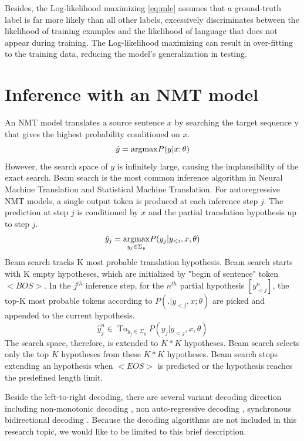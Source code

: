 Besides, the Log-likelihood maximizing \ref{eq:mle} assumes that a ground-truth label is far more likely than all other labels, excessively discriminates between the likelihood of training examples and the likelihood of language that does not appear during training. The Log-likelihood maximizing can result in over-fitting to the training data, reducing the model's generalization in testing.

\section{Inference with an NMT model} \label{sec:inference}
An NMT model translates a source sentence $x$ by searching the target sequence y that gives the highest probability conditioned on $x$.
\begin{equation}
\hat{y} = \displaystyle{\mathop{\operatorname*{argmax}}} P(y|x;\theta)
\end{equation}
However, the search space of $y$ is infinitely large, causing the implausibility of the exact search. Beam search \citep{Och98improving} is the most common inference algorithm in Neural Machine Translation and Statistical Machine Translation. For autoregressive NMT models, a single output token is produced at each inference step $j$. The prediction at step $j$ is conditioned by $x$ and the partial translation hypothesis up to step $j$.
\begin{equation}
\hat{y}_j = \displaystyle{\mathop{\operatorname*{argmax}}_{y_j \in \Sigma_y}} P(y_j|y_{<i},x,\theta)
\end{equation}
Beam search tracks K most probable translation hypothesis. Beam search starts with K empty hypotheses, which are initialized by "begin of sentence" token $<BOS>$. In the $j^{th}$ inference step,
for the $n^{th}$ partial hypothesis $[y^{n}_{<j}]$, the top-K most probable tokens according to $P(.| y_{<j},x;\theta)$ are picked and appended to the current hypothesis.
\begin{equation}
\hat{y}^n_j \in \displaystyle{\mathop{Top_{K}}_{y_j \in \Sigma_y}} P(y_j|y_{<j},x,\theta)
\end{equation}
The search space, therefore, is extended to $K*K$ hypotheses. Beam search selects only the top $K$ hypotheses from these $K*K$ hypotheses. Beam search stops extending an hypothesis when $<EOS>$ is predicted or  the hypothesis reaches the predefined length limit. 

Beside the left-to-right decoding, there are several variant decoding direction including non-monotonic decoding \citep{Welleck19non}, non auto-regressive decoding \citep{Jiatao17non}, synchronous bidirectional decoding \cite{Zhou19synchronous}. Because the decoding algorithms are not included in this research topic, we would like to be limited to this brief description.
